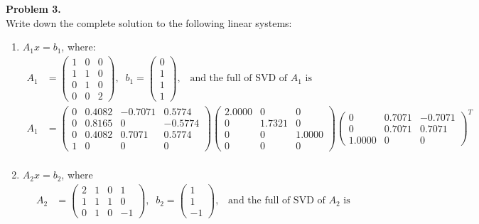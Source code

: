 \documentclass[11pt]{article}
\begin{document}
\noindent \textbf{Problem 3.}\\
Write down the complete solution to the following linear systems:
\begin{enumerate}
\item $A_1 x = b_1$, where:
\begin{align*}
A_1 &= \begin{pmatrix} 1 & 0 & 0 \\ 1 & 1 & 0 \\ 0 & 1 & 0 \\ 0 & 0 & 2 \end{pmatrix}, \;\; b_1  = \begin{pmatrix} 0 \\ 1 \\ 1 \\ 1 \end{pmatrix}, \;\;\; \text{and the full of SVD of $A_1$ is} \\
A_1&= \begin{pmatrix}  0  &  0.4082  &  -0.7071 & 0.5774 \\ 0 & 0.8165 & 0  & -0.5774 \\ 0  &  0.4082 &   0.7071  &  0.5774 \\ 1 &  0 & 0 & 0 \end{pmatrix}
           \begin{pmatrix}  2.0000 &  0 & 0 \\ 0 & 1.7321 &  0  \\ 0 &  0  & 1.0000 \\ 0  & 0  &  0 \end{pmatrix}
           \begin{pmatrix}        0 &   0.7071  & -0.7071 \\ 0  &  0.7071  &  0.7071 \\ 1.0000  &       0     &    0 \end{pmatrix}^T\\
\end{align*}
\item  $A_2 x = b_2$, where
\begin{align*}
A_2 &= \begin{pmatrix} 2 & 1 & 0 & 1 \\ 1 & 1 & 1 & 0 \\ 0 & 1 & 0 & -1 \end{pmatrix}, \;\; b_2  = \begin{pmatrix} 1 \\ 1 \\ -1 \end{pmatrix}, \;\;\; \text{and the full of SVD of $A_2$ is} \\

\end{align*}
\end{enumerate}
\end{document}
